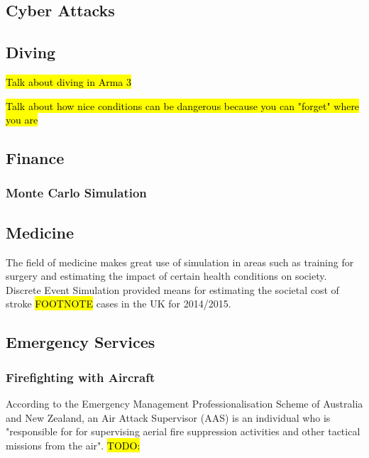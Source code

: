 \documentclass{article}
\begin{document}
\subsection{Cyber Attacks}

\subsection{Diving}

\hl{Talk about diving in Arma 3}

\hl{Talk about how nice conditions can be dangerous because you can "forget" where you are}

\subsection{Finance}

\subsubsection{Monte Carlo Simulation}



\subsection{Medicine}


The field of medicine makes great use of simulation in areas such as training for surgery  and estimating the impact of certain health conditions on society. Discrete Event Simulation provided means for estimating the societal cost of stroke \hl{FOOTNOTE} cases in the UK for 2014/2015. \cite{afz162}

\subsection{Emergency Services}

\subsubsection{Firefighting with Aircraft}

According to the Emergency Management Professionalisation Scheme of Australia and New Zealand, an Air Attack Supervisor (AAS) is an individual who is "responsible for for supervising aerial fire suppression activities and other tactical missions from the air". \hl{TODO:}
\end{document}
